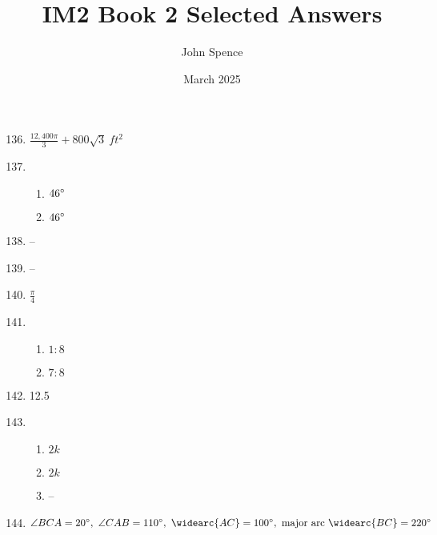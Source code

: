 \documentclass{article}
\title{IM2 Book 2 Selected Answers}
\author{John Spence}
\date{March 2025}
\begin{document}
\maketitle

\begin{enumerate}

\setcounter{enumi}{135}

\item $\frac{12,400 \pi}{3} + 800 \sqrt{3} \ ft^2$

\item

	\begin{enumerate}
	
	\item $46 \degree$
	
	\item $46 \degree$
	
	\end{enumerate}
	
\item -- 

\item --

\item $\frac{\pi}{4}$

\item 

	\begin{enumerate}
	
	\item $1:8$
	
	\item $7:8$
	
	\end{enumerate}
	
\item 12.5

\item

	\begin{enumerate}
	
	\item $2k$
	
	\item $2k$
	
	\item --
	
	\end{enumerate}
	
\item $\angle BCA = 20 \degree, \ \angle CAB = 110 \degree, \ \widearc{AC} = 100 \degree, \ \text{major arc } \widearc{BC} = 220 \degree$


\end{enumerate}
\end{document}
